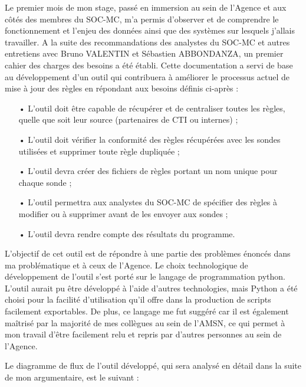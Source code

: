\vspace{1em}
Le premier mois de mon stage, passé en immersion au sein de l'Agence et aux côtés des membres du SOC-MC, m'a permis d'observer et de comprendre le fonctionnement et l'enjeu des données ainsi que des systèmes sur lesquels j'allais travailler. A la suite des recommandations des analystes du SOC-MC et autres entretiens avec Bruno VALENTIN et Sébastien ABBONDANZA, un premier cahier des charges des besoins a été établi. Cette documentation a servi de base au développement d'un outil qui contribuera à améliorer le processus actuel de mise à jour des règles en répondant aux besoins définis ci-après :\\

\begin{itemize}[itemsep=1em]
    \item[•] L'outil doit être capable de récupérer et de centraliser toutes les règles, quelle que soit leur source (partenaires de CTI ou internes) ;
    \item[•] L'outil doit vérifier la conformité des règles récupérées avec les sondes utilisées et supprimer toute règle dupliquée ;
    \item[•] L'outil devra créer des fichiers de règles portant un nom unique pour chaque sonde ;
    \item[•] L'outil permettra aux analystes du SOC-MC de spécifier des règles à modifier ou à supprimer avant de les envoyer aux sondes ;
    \item[•] L'outil devra rendre compte des résultats du programme.\\
\end{itemize}

L'objectif de cet outil est de répondre à une partie des problèmes énoncés dans ma problématique et à ceux de l'Agence. Le choix technologique de développement de l'outil s'est porté sur le langage de programmation python. L'outil aurait pu être développé à l'aide d'autres technologies, mais Python a été choisi pour la facilité d'utilisation qu'il offre dans la production de scripts facilement exportables. De plus, ce langage me fut suggéré car il est également maîtrisé par la majorité de mes collègues au sein de l'AMSN, ce qui permet à mon travail d'être facilement relu et repris par d'autres personnes au sein de l'Agence.\\

\newpage

Le diagramme de flux de l'outil développé, qui sera analysé en détail dans la suite de mon argumentaire, est le suivant :\\

